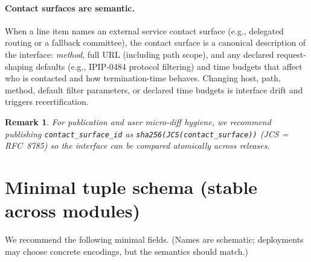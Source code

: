 \documentclass[11pt]{article}
\newtheorem{remark}{Remark}
\begin{document}
\paragraph{Contact surfaces are semantic.}
When a line item names an external service contact surface (e.g., delegated routing or a fallback committee), the contact surface is a canonical description of the interface: \emph{method}, full URL (including path scope), and any declared request-shaping defaults (e.g., IPIP-0484 protocol filtering) and time budgets that affect who is contacted and how termination-time behaves. Changing host, path, method, default filter parameters, or declared time budgets is interface drift and triggers recertification.
\cite{series:deployedsurfaces,series:planstateequiv,series:recert}

\begin{remark}
For publication and user micro-diff hygiene, we recommend publishing \texttt{contact\_surface\_id} as \texttt{sha256(JCS(contact\_surface))} (JCS = RFC~8785)\cite{rfc8785} so the interface can be compared atomically across releases.
\end{remark}

\section{Minimal tuple schema (stable across modules)}
We recommend the following minimal fields.
(Names are schematic; deployments may choose concrete encodings, but the semantics should match.)
\end{document}
